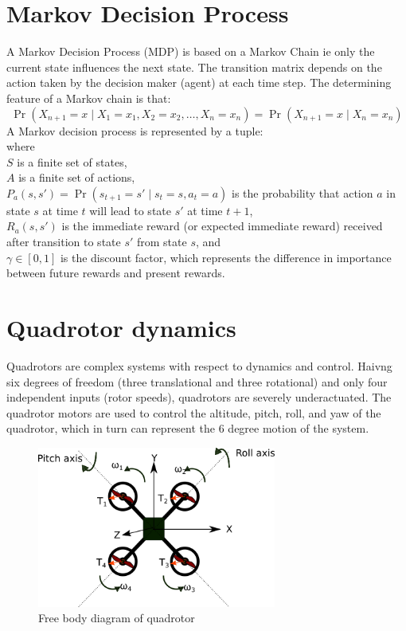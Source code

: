 \documentclass[hidelinks,BTech]{iitmdiss}
\begin{document}
\section {Markov Decision Process}
A Markov Decision Process (MDP) is based on a Markov Chain ie only the current state influences the next state. The transition matrix depends on the action taken by the decision maker (agent) at each time step. The determining feature of a Markov chain is that:
\begin{equation}
\Pr(X_{n+1}=x\mid X_1=x_1, X_2=x_2, \ldots, X_n=x_n) = \Pr(X_{n+1}=x\mid X_n=x_n)
\end{equation}
A Markov decision process is represented by a tuple:
\begin{equation}
[S, A, P_a(s,s'), R_a(s,s'), \gamma]
\end{equation}
where\\
$S$ is a finite set of states,\\
$A$ is a finite set of actions,\\
$P_a(s,s') = \Pr(s_{t+1}=s' \mid s_t=s, a_t=a)$ is the probability that action $a$ in state $s$ at time $t$ will lead to state $s'$ at time $t+1$,\\
$R_a(s,s')$ is the immediate reward (or expected immediate reward) received after transition to state $s'$ from state $s$, and\\
$\gamma \in [0,1]$ is the discount factor, which represents the difference in importance between future rewards and present rewards.


\section{Quadrotor dynamics}
Quadrotors are complex systems with respect to dynamics and control. Haivng six degrees of freedom (three translational and three rotational) and only four independent inputs (rotor speeds), quadrotors are severely underactuated. The quadrotor motors are used to control the altitude, pitch, roll, and yaw of the quadrotor, which in turn can represent the 6 degree motion of the system.
\begin{figure}[H]
  \centering
    \includegraphics[width=0.7\textwidth]{Quadrotor_fbd.png}
    \caption{Free body diagram of quadrotor}
\end{figure}
\end{document}
